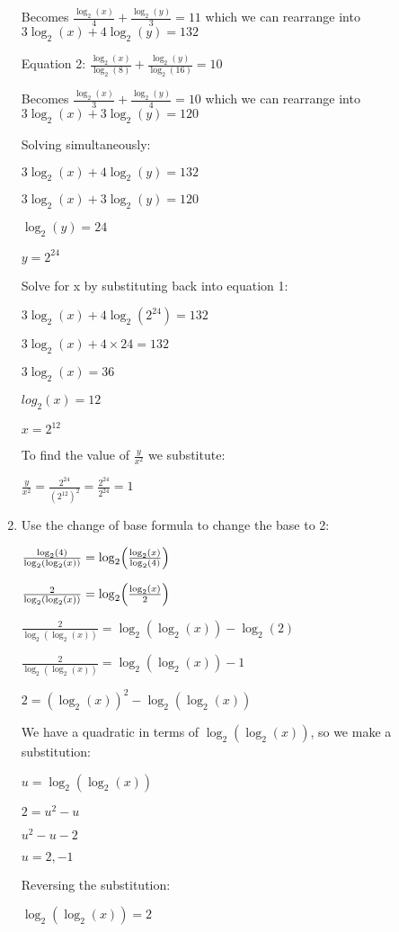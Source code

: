 \documentclass[../main.tex]{subfiles}
\begin{document}
\begin{enumerate}[itemsep=0.4cm]
    Becomes $\frac{\log_2(x)}{4}+\frac{\log_2(y)}{3}=11 $ which we can rearrange into $3\log_2(x)+4\log_2(y)=132$

    Equation 2: $\frac{\log_2(x)}{\log_2(8)}+\frac{\log_2(y)}{\log_2(16)}=10$

    Becomes $\frac{\log_2(x)}{3}+\frac{\log_2(y)}{4}=10$ which we can rearrange into $3\log_2(x)+3\log_2(y)=120$

    Solving simultaneously:

    \(3\log_2(x)+4\log_2(y)=132\)

    \(3\log_2(x)+3\log_2(y)=120\)

    \(\log_2(y)=24\)

    \(y=2^{24}\)

    Solve for x by substituting back into equation 1:

    \(3\log_2(x)+4\log_2(2^{24})=132\)

    \(3\log_2(x)+4\times 24=132\)

    \(3\log_2(x)=36\)

    \(log_2(x)=12\)

    \(x=2^{12}\)

    To find the value of $\frac{y}{x^2}$ we substitute:

    \(\frac{y}{x^2}=\frac{2^{24}}{(2^{12})^2}=\frac{2^{24}}{2^{24}}=1\)

    \item 
    Use the change of base formula to change the base to 2:

    \(\frac{\log_2(4)}{\log_2(\log_2(x))}=\log_2\Bigl(\frac{\log_2(x)}{\log_2(4)}\Bigr) \)

    \(\frac{2}{\log_2(\log_2(x))}=\log_2\Bigl(\frac{\log_2(x)}{2}\Bigr) \)

    \(\frac{2}{\log_2(\log_2(x))}=\log_2(\log_2(x))-\log_2(2) \)

    \(\frac{2}{\log_2(\log_2(x))}=\log_2(\log_2(x))-1 \)

    \(2=(\log_2(x))^2-\log_2(\log_2(x))\)

    We have a quadratic in terms of $\log_2(\log_2(x))$, so we make a substitution:

    \(u=\log_2(\log_2(x))\)

    \(2=u^2-u\)

    \(u^2-u-2\)

    \(u=2, -1\)

    Reversing the substitution:

    \(\log_2(\log_2(x))=2\)


\end{enumerate}
\end{document}
